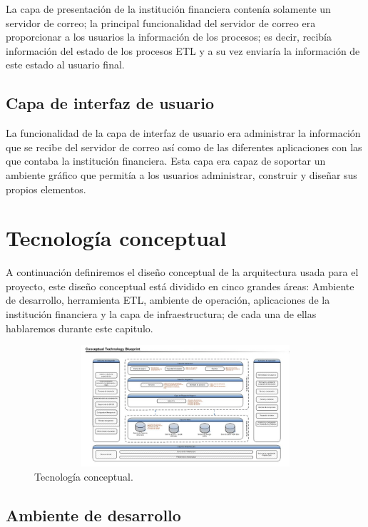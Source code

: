 La capa de presentación de la institución financiera contenía solamente un
servidor de correo; la principal funcionalidad del servidor de correo era
proporcionar a los usuarios la información de los procesos; es decir, recibía
información del estado de los procesos ETL y a su vez enviaría la información
de este estado al usuario final.

\subsection{Capa de interfaz de usuario}

La funcionalidad de la capa de interfaz de usuario era administrar la
información que se recibe del servidor de correo así como de las diferentes
aplicaciones con las que contaba la institución financiera. Esta capa era capaz
de soportar un ambiente gráfico que permitía a los usuarios administrar,
construir y diseñar sus propios elementos.

\section{Tecnología conceptual}

A continuación definiremos el diseño conceptual de la arquitectura usada para el
proyecto, este diseño conceptual está dividido en cinco grandes áreas: Ambiente
de desarrollo, herramienta ETL, ambiente de operación, aplicaciones de la
institución financiera y la capa de infraestructura; de cada una de ellas
hablaremos durante este capitulo.

\begin{figure}[htb]
  \begin{center}
    \includegraphics[width=12cm, height=4.5cm, scale=0.5]{Tecnologia_Conceptual.jpg}
        \caption{Tecnología conceptual.}
    \label{fig:conceptual}
  \end{center}
\end{figure}

\subsection{Ambiente de desarrollo}

